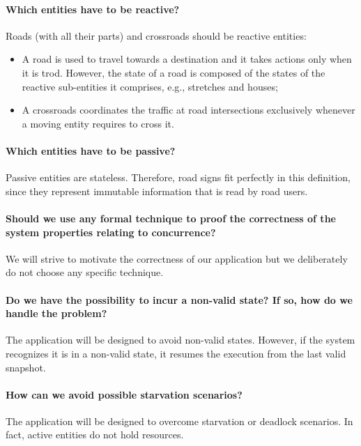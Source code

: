 \paragraph{Which entities have to be reactive?}
Roads (with all their parts) and crossroads should be reactive entities:
\begin{itemize}
  \item A road is used to travel towards a destination and it takes actions
    only when it is trod.
    However, the state of a road is composed of the states of the reactive
    sub-entities it comprises, e.g., stretches and houses;
  \item A crossroads coordinates the traffic at road intersections exclusively
    whenever a moving entity requires to cross it.
\end{itemize}

\paragraph{Which entities have to be passive?}
Passive entities are stateless. Therefore, road signs fit perfectly in this
definition, since they represent immutable information that is read by road
users.

\paragraph{Should we use any formal technique to proof the correctness
of the system properties relating to concurrence?}
We will strive to motivate the correctness of our application but we
deliberately do not choose any specific technique.

\paragraph{Do we have the possibility to incur a non-valid state?
If so, how do we handle the problem?}
The application will be designed to avoid non-valid states. However, if the
system recognizes it is in a non-valid state, it resumes the execution from the
last valid snapshot.

\paragraph{How can we avoid possible starvation scenarios?}
The application will be designed to overcome starvation or deadlock scenarios.
In fact, active entities do not hold resources.


